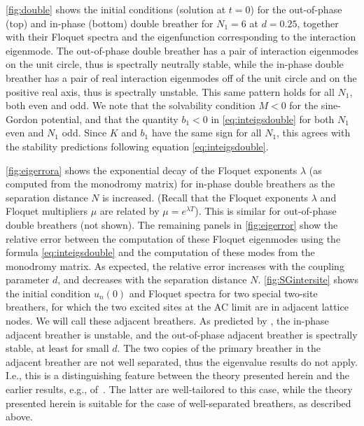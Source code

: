 \documentclass[12pt,reqno]{amsart}
\theoremstyle{definition}
\begin{document}
\cref{fig:double} shows the initial conditions (solution at $t=0$) for the out-of-phase (top) and in-phase (bottom) double breather for $N_1 = 6$ at $d = 0.25$, together with their Floquet spectra and the eigenfunction corresponding to the interaction eigenmode. The out-of-phase double breather has a pair of interaction eigenmodes on the unit circle, thus is spectrally neutrally stable, while the in-phase double breather has a pair of real interaction eigenmodes off of the unit circle and on the positive real axis, thus is spectrally unstable. This same pattern holds for all $N_1$, both even and odd. We note that the solvability condition $M < 0$ for the sine-Gordon potential, and that the quantity $b_1 < 0$ in \cref{eq:inteigsdouble} for both $N_1$ even and $N_1$ odd. Since $K$ and $b_1$ have the same sign for all $N_1$, this agrees with the stability predictions following equation \cref{eq:inteigsdouble}.

\cref{fig:eigerrora} shows the exponential decay of the Floquet exponents $\lambda$ (as computed from the monodromy matrix) for in-phase double breathers as the separation distance $N$ is increased. (Recall that the Floquet exponents $\lambda$ and Floquet multipliers $\mu$ are related by $\mu = e^{\lambda T}$).
This is similar for out-of-phase double breathers (not shown). The remaining panels in \cref{fig:eigerror} show the relative error between the computation of these Floquet eigenmodes using the formula \cref{eq:inteigsdouble} and the computation of these modes from the monodromy matrix. As expected, the relative error increases with the coupling parameter $d$, and decreases with the separation distance $N$. \cref{fig:SGintersite} shows the initial condition $u_n(0)$ and Floquet spectra for two special two-site breathers, for which the two excited sites at the AC limit are in adjacent lattice nodes. We will call these adjacent breathers.
As predicted by \cite{cuevas-maraver2016}, the in-phase adjacent breather is unstable, and the out-of-phase adjacent breather is spectrally stable, at least for small $d$. The two copies of the primary breather in the adjacent breather are not well separated, thus the eigenvalue results do not apply. I.e., this is a
distinguishing feature between the theory presented herein
and the earlier results, e.g., of~\cite{Archilla2003,Koukouloyannis2009}. The latter are
well-tailored to this case, while the theory presented herein
is suitable for the case of well-separated breathers, as 
described above.
\end{document}
